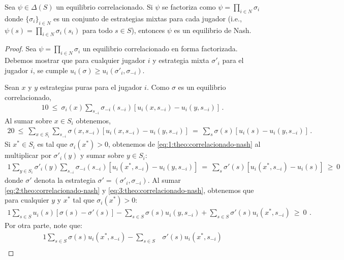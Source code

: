 \begin{theorem}
\label{theo:correlacionado-nash}
Sea $\psi\in\Delta(S)$ un equilibrio correlacionado. Si $\psi$ se factoriza como $\psi=\prod_{i\in N} \sigma_i$ donde $\{\sigma_i\}_{i\in N}$ es un conjunto de estrategias mixtas para cada jugador (i.e., $\psi(s)=\prod_{i \in N} \sigma_i(s_i)$ para todo $s\in S$), entonces $\psi$ es un equilibrio de Nash.
\end{theorem}

\begin{proof}
Sea $\psi= \prod_{i \in N} \sigma_i$ un equilibrio correlacionado en forma factorizada. Debemos mostrar que para cualquier jugador $i$ y estrategia mixta $\sigma'_i$ para el jugador $i$, se cumple $u_i(\sigma) \geq u_i(\sigma'_i, \sigma_{-i})$.

Sean $x$ y $y$ estrategias puras para el jugador $i$.
Como $\sigma$ es un equilibrio correlacionado,
\begin{alignat}{1}
\label{eq:1:theo:correlacionado-nash}
0\ \leq\ \sigma_i(x) \sum_{s_{-i}} \sigma_{-i}(s_{-i})[u_i(x, s_{-i}) - u_i(y, s_{-i})] \,.
\end{alignat}
Al sumar sobre $x\in S_i$ obtenemos, 
\begin{alignat}{2}
\label{eq:2:theo:correlacionado-nash}
0\ \leq\ \sum_{x\in S_i} \sum_{s_{-i}} \sigma(x,s_{-i}) [u_i(x, s_{-i}) - u_i(y, s_{-i})]\ =\ \sum_s \sigma(s) [u_i(s) - u_i(y, s_{-i})] \,.
\end{alignat}
Si $x^* \in S_i$ es tal que $\sigma_i(x^*)>0$, obtenemos de \eqref{eq:1:theo:correlacionado-nash} al multiplicar por $\sigma'_i(y)$ y sumar sobre $y\in S_i$:
\begin{alignat}{1}
\label{eq:3:theo:correlacionado-nash}
\sum_{y \in S_i} \sigma'_i(y) \sum_{s_{-i}} \sigma_{-i} (s_{-i}) [u_i(x^*, s_{-i}) - u_i(y, s_{-i})]\ =\ \sum_{s} \sigma'(s) [u_i(x^*, s_{-i}) - u_i(s)]\ \geq\ 0
\end{alignat}
donde $\sigma'$ denota la estrategia $\sigma'=(\sigma'_i,\sigma_{-i})$. 
Al sumar \eqref{eq:2:theo:correlacionado-nash} y
\eqref{eq:3:theo:correlacionado-nash}, obtenemos que para cualquier $y$ y $x^*$ tal que $\sigma_i(x^*)>0$:
\begin{alignat}{1}
\label{eq:4:theo:correlacionado-nash}
\sum_{s \in S} u_i(s) [\sigma(s) - \sigma'(s)] - \sum_{s \in S} \sigma(s)u_i(y, s_{-i}) + \sum_{s \in S} \sigma'(s) u_i(x^*, s_{-i})\ \geq\ 0\ \,.
\end{alignat}
Por otra parte, note que:
\begin{alignat}{1}
  \sum_{s \in S} \sigma(s) u_i(x^*,s_{-i}) - \sum_{s \in S} &\sigma'(s) u_i(x^*,s_{-i}) \\

\end{alignat}
\end{proof}
